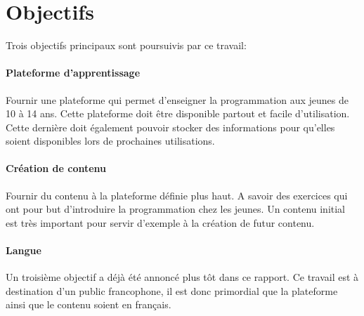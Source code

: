 ﻿\section{Objectifs}
\label{intro-objectifs}

Trois objectifs principaux sont poursuivis par ce travail:

\paragraph{Plateforme d'apprentissage} Fournir une plateforme qui permet d'enseigner la programmation aux jeunes de 10 à 14 ans. Cette plateforme doit être disponible partout et facile d'utilisation. Cette dernière doit également pouvoir stocker des informations pour qu'elles soient disponibles lors de prochaines utilisations.

\paragraph{Création de contenu} Fournir du contenu à la plateforme définie plus haut. A savoir des exercices qui ont pour but d'introduire la programmation chez les jeunes. Un contenu initial est très important pour servir d'exemple à la création de futur contenu.

\paragraph{Langue} Un troisième objectif a déjà été annoncé plus tôt dans ce rapport. Ce travail est à destination d'un public francophone, il est donc primordial que la plateforme ainsi que le contenu soient en français.
